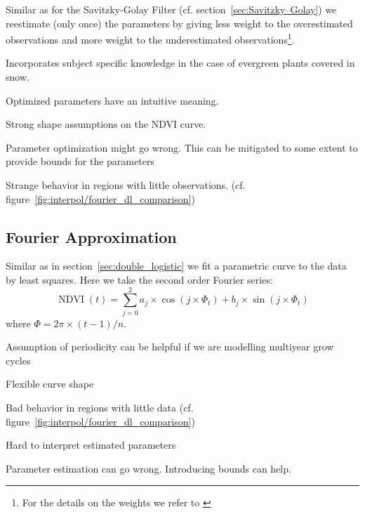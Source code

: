 Similar as for the Savitzky-Golay Filter (cf. section~\ref{sec:Savitzky–Golay}) we reestimate (only once) the parameters by giving less weight to the overestimated observations and more weight to the underestimated observations\footnote{For the details on the weights we refer to \cite{beckImprovedMonitoringVegetation2006}}.

\begin{my_pros_cons_table}{
		\item Incorporates subject specific knowledge in the case of evergreen plants covered in snow.
		\item Optimized parameters have an intuitive meaning.
	}{
		\item Strong shape assumptions on the NDVI curve.
		\item Parameter optimization might go wrong. This can be mitigated to some extent to provide bounds for the parameters
		\item Strange behavior in regions with little observations. (cf. figure~\ref{fig:interpol/fourier_dl_comparison})
	}
\end{my_pros_cons_table}


\subsection{Fourier Approximation}
\label{sec:fourier_approx}
Similar as in section~\ref{sec:double_logistic} we fit a parametric curve to the data by least squares. Here we take the second order Fourier series:
$$
	\operatorname{NDVI}(t)=\sum_{j=0}^{2} a_{j} \times \cos \left(j \times \Phi_{t}\right)+b_{j} \times \sin \left(j \times \Phi_{t}  \right)
$$
where $\Phi=2 \pi \times(t-1) / n$.


\begin{my_pros_cons_table}{
		\item Assumption of periodicity can be helpful if we are modelling multiyear grow cycles
		\item Flexible curve shape
	}{
		\item Bad behavior in regions with little data (cf. figure~\ref{fig:interpol/fourier_dl_comparison})
		\item Hard to interpret estimated parameters
		\item Parameter estimation can go wrong. Introducing bounds can help.
	}
\end{my_pros_cons_table}

